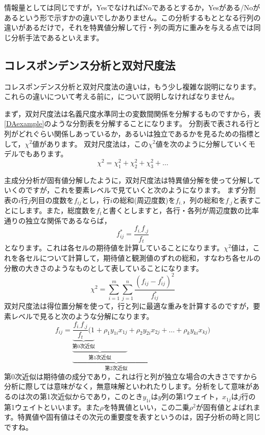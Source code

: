 \documentclass{ltjsbook}
\begin{document}
情報量としては同じですが，YesでなければNoであるとするか，Yesがある/Noがあるという形で示すかの違いでしかありません。この分析するもととなる行列の違いがあるだけで，それを特異値分解して行・列の両方に重みを与える点では同じ分析手法であるといえます。
\subsection{コレスポンデンス分析と双対尺度法}
コレスポンデンス分析と双対尺度法の違いは，もう少し複雑な説明になります。これらの違いについて考える前に，について説明しなければなりません。

まず，双対尺度法は名義尺度水準同士の変数間関係を分解するものですから，表\ref{DAexample}のような分割表を分解することになります。
分割表で表される行と列がどれぐらい関係しあっているか，あるいは独立であるかを見るための指標として，$\chi^2$値があります。
双対尺度法は，この$\chi^2$値を次のように分解していくモデルでもあります。
\begin{equation}
	\chi^{2}=\chi_{1}^{2}+\chi_{2}^{2}+\chi_{3}^{2}+\ldots
	\label{chi}
\end{equation}

主成分分析が固有値分解したように，双対尺度法は特異値分解を使って分解していくのですが，これを要素レベルで見ていくと次のようになります。
まず分割表の$i$行$j$列目の度数を$f_{ij}$とし，行$i$の総和(周辺度数)を$f_{i.}$，列の総和を$f_{.j}$と表すことにします。また，総度数を$f_t$と書くとしますと，各行・各列が周辺度数の比率通りの独立な関係であるならば，
\[ f^{\ast}_{ij} = \frac{f_{i.}f_{.j}}{f_t} \]
となります。これは各セルの期待値を計算していることになります。$\chi^2$値は，これを各セルについて計算して，期待値と観測値のずれの総和，すなわち各セルの分散の大きさのようなものとして表していることになります。
\[ \chi^2 = \sum_{i=1}^m \sum_{j=1}^n \frac{(f_{ij}-f^{\ast}_{ij})^2}{f^{\ast}_{ij}} \]
双対尺度法は得位置分解を使って，行と列に最適な重みを計算するのですが，要素レベルで見ると次のような分解になります。
\[
	f_{ij}=\underbrace{\underbrace{\underbrace{\frac{f_{i.}f_{.j}}{f_{t}}( 1}_{第0次近似}+\rho_{1}y_{1i}x_{1j}}_{第1次近似}+\rho_{2}y_{2i}x_{2j}}_{第2次近似}+\ldots+\rho_{k}y_{ki}x_{kj})
\]
第0次近似は期待値の成分であり，これは行と列が独立な場合の大きさですから分析に際しては意味がなく，無意味解といわれたりします。分析をして意味があるのは次の第1次近似からであり，このとき$y_{1i}$は$y$列の第1ウェイト，$x_{1j}$は$j$行の第1ウェイトといいます。また$\rho$を特異値といい，この二乗$\rho^2$が固有値とよばれます。特異値や固有値はその次元の重要度を表すというのは，因子分析の時と同じですね。
\end{document}
